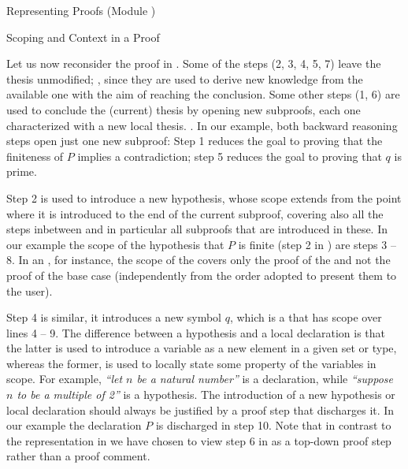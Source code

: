 \begin{omgroup}[id=proofs,short=Representing Proofs]{Representing Proofs (Module {})}
\begin{module}[id=scoping-proofs]
\begin{omgroup}[id=proofs.scoping]{Scoping and Context in a Proof}
\begin{omtext}
Let us now reconsider the proof in {}. Some of the steps (2, 3,
4, 5, 7) leave the thesis unmodified; , since they are
used to derive new knowledge from the available one with the aim of reaching the
conclusion.  Some other steps (1, 6) are used to conclude the (current) thesis by opening
new subproofs, each one characterized with a new local thesis.  .  In our example, both backward reasoning steps open just one
new subproof: Step 1 reduces the goal to proving that the finiteness of $P$ implies a
contradiction; step 5 reduces the goal to proving that $q$ is prime.
\end{omtext}

Step 2 is used to introduce a new hypothesis, whose scope extends from the point where it
is introduced to the end of the current subproof, covering also all the steps inbetween
and in particular all subproofs that are introduced in these. In our example the scope of
the hypothesis that $P$ is finite (step 2 in {}) are steps 3 --
8. In an {}, for instance, the scope of the
{} covers only the proof of the {}
and not the proof of the base case (independently from the order adopted to present them
to the user).
  
Step 4 is similar, it introduces a new symbol $q$, which is a
{} that has scope over lines 4 -- 9.  The difference between a
hypothesis and a local declaration is that the latter is used to introduce a variable as a
new element in a given set or type, whereas the former, is used to locally state some
property of the variables in scope. For example, {\emph{``let $n$ be a natural number''}}
is a declaration, while {\emph{``suppose $n$ to be a multiple of 2''}} is a hypothesis.
The introduction of a new hypothesis or local declaration should always be justified by a
proof step that discharges it. In our example the declaration $P$ is discharged in step
10. Note that in contrast to the representation in {} we have
chosen to view step 6 in {} as a top-down proof step rather
than a proof comment.
  

\end{omgroup}
\end{module}
\end{omgroup}
